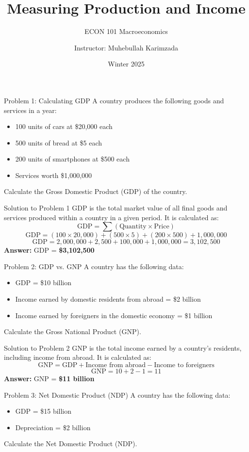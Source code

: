 \documentclass{beamer}
\title{Measuring Production and Income}
\subtitle{ECON 101 Macroeconomics}
\author{Instructor: Muhebullah Karimzada}
\date{Winter 2025}
\begin{document}
\begin{frame}
\titlepage
\end{frame}

\begin{frame}{Problem 1: Calculating GDP}
A country produces the following goods and services in a year:
\begin{itemize}
    \item 100 units of cars at \$20,000 each
    \item 500 units of bread at \$5 each
    \item 200 units of smartphones at \$500 each
    \item Services worth \$1,000,000
\end{itemize}
Calculate the Gross Domestic Product (GDP) of the country.
\end{frame}

\begin{frame}{Solution to Problem 1}
GDP is the total market value of all final goods and services produced within a country in a given period. It is calculated as:
\[
\text{GDP} = \sum (\text{Quantity} \times \text{Price})
\]
\[
\text{GDP} = (100 \times 20,000) + (500 \times 5) + (200 \times 500) + 1,000,000
\]
\[
\text{GDP} = 2,000,000 + 2,500 + 100,000 + 1,000,000 = 3,102,500
\]
\textbf{Answer:} GDP = \textbf{\$3,102,500}
\end{frame}

\begin{frame}{Problem 2: GDP vs. GNP}
A country has the following data:
\begin{itemize}
    \item GDP = \$10 billion
    \item Income earned by domestic residents from abroad = \$2 billion
    \item Income earned by foreigners in the domestic economy = \$1 billion
\end{itemize}
Calculate the Gross National Product (GNP).
\end{frame}

\begin{frame}{Solution to Problem 2}
GNP is the total income earned by a country's residents, including income from abroad. It is calculated as:
\[
\text{GNP} = \text{GDP} + \text{Income from abroad} - \text{Income to foreigners}
\]
\[
\text{GNP} = 10 + 2 - 1 = 11
\]
\textbf{Answer:} GNP = \textbf{\$11 billion}
\end{frame}

\begin{frame}{Problem 3: Net Domestic Product (NDP)}
A country has the following data:
\begin{itemize}
    \item GDP = \$15 billion
    \item Depreciation = \$2 billion
\end{itemize}
Calculate the Net Domestic Product (NDP).
\end{frame}
\end{document}
